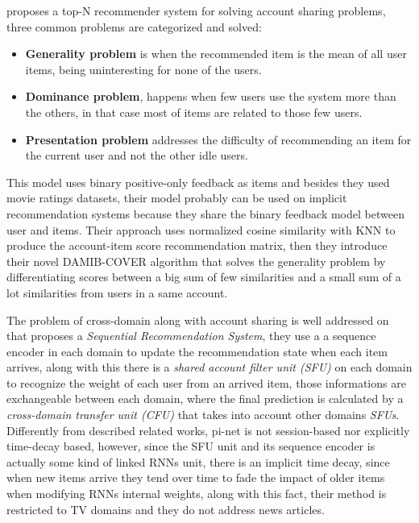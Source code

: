 \documentclass[ecp,tc,english]{iiufrgs}
\begin{document}
\cite{verstrepen2015} proposes a top-N recommender system for solving account sharing problems, three common problems are categorized and solved:
\begin{itemize}
    \item \textbf{Generality problem} is when the recommended item is the mean of all user items, being uninteresting for none of the users.
    \item \textbf{Dominance problem}, happens when few users use the system more than the others, in that case most of items are related to those few users.
    \item \textbf{Presentation problem} addresses the difficulty of recommending an item for the current user and not the other idle users.
\end{itemize}

This model uses binary positive-only feedback as items and besides they used movie ratings datasets, their model probably can be used on implicit recommendation systems because they share the binary feedback model between user and items.
Their approach uses normalized cosine similarity with KNN \cite{fix1951} to produce the account-item score recommendation matrix, then they introduce their novel DAMIB-COVER algorithm that solves the generality problem by differentiating scores between a big sum of few similarities and a small sum of a lot similarities from users in a same account.

The problem of cross-domain along with account sharing is well addressed on \cite{ma2019} that proposes a \textit{Sequential Recommendation System}, they use a a sequence encoder in each domain to update the recommendation state when each item arrives, along with this there is a \textit{shared account filter unit (SFU)} on each domain to recognize the weight of each user from an arrived item, those informations are exchangeable between each domain, where the final prediction is calculated by a \textit{cross-domain transfer unit (CFU)} that takes into account other domains \textit{SFUs}. Differently from described related works, pi-net is not session-based nor explicitly time-decay based, however, since the SFU unit and its sequence encoder is actually some kind of linked RNNs unit, there is an implicit time decay, since when new items arrive they tend over time to fade the impact of older items when modifying RNNs internal weights, along with this fact, their method is restricted to TV domains and they do not address news articles.
\end{document}
